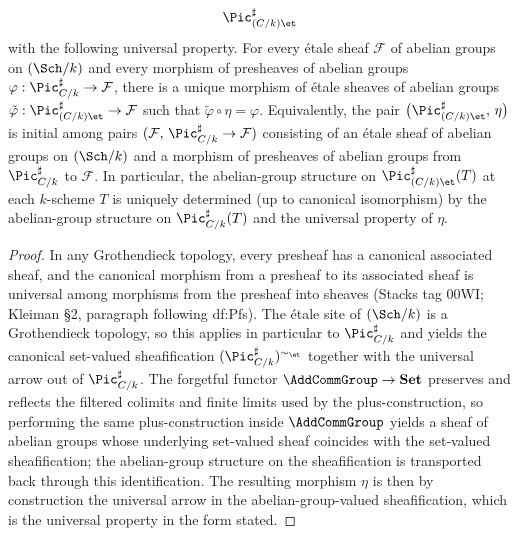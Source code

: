 \begin{theorem}
\[    \Pic^\sharp_{(C/k)\et}
  \]
  with the following universal property. For every \'etale sheaf
  \(\mathcal{F}\) of abelian groups on \((\Sch/k)\) and every morphism
  of presheaves of abelian groups
  \(\varphi : \Pic^\sharp_{C/k} \to \mathcal{F}\), there is a unique
  morphism of \'etale sheaves of abelian groups
  \(\tilde\varphi : \Pic^\sharp_{(C/k)\et} \to \mathcal{F}\) such that
  \(\tilde\varphi \circ \eta = \varphi\). Equivalently, the pair
  \(\bigl(\Pic^\sharp_{(C/k)\et}, \, \eta\bigr)\) is initial among
  pairs \((\mathcal{F}, \, \Pic^\sharp_{C/k} \to \mathcal{F})\)
  consisting of an \'etale sheaf of abelian groups on \((\Sch/k)\) and
  a morphism of presheaves of abelian groups from \(\Pic^\sharp_{C/k}\)
  to \(\mathcal{F}\). In particular, the abelian-group structure on
  \(\Pic^\sharp_{(C/k)\et}(T)\) at each \(k\)-scheme \(T\) is uniquely
  determined (up to canonical isomorphism) by the abelian-group
  structure on \(\Pic^\sharp_{C/k}(T)\) and the universal property of
  \(\eta\).
\end{theorem}

\begin{proof}

  In any Grothendieck topology, every presheaf has a canonical
  associated sheaf, and the canonical morphism from a presheaf to its
  associated sheaf is universal among morphisms from the presheaf into
  sheaves (Stacks tag 00WI; Kleiman \S 2, paragraph following
  df:Pfs). The \'etale site of \((\Sch/k)\) is a Grothendieck
  topology, so this applies in particular to \(\Pic^\sharp_{C/k}\) and
  yields the canonical set-valued sheafification
  \((\Pic^\sharp_{C/k})^{\sim_\et}\) together with the universal arrow
  out of \(\Pic^\sharp_{C/k}\). The forgetful functor
  \(\AddCommGroup \to \mathbf{Set}\) preserves and reflects the
  filtered colimits and finite limits used by the plus-construction,
  so performing the same plus-construction inside \(\AddCommGroup\)
  yields a sheaf of abelian groups whose underlying set-valued sheaf
  coincides with the set-valued sheafification; the abelian-group
  structure on the sheafification is transported back through this
  identification. The resulting morphism \(\eta\) is then by
  construction the universal arrow in the abelian-group-valued
  sheafification, which is the universal property in the form stated.
\end{proof}

